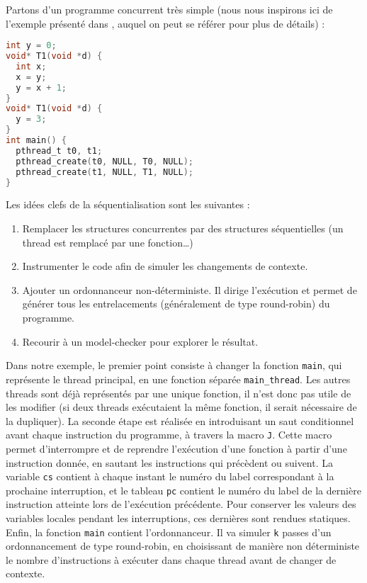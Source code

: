 Partons d'un programme concurrent très simple (nous nous inspirons ici
de l'exemple présenté dans \cite{LazyCSeq}, auquel on peut se
référer pour plus de détails) :

\begin{lstlisting}[language=C]
int y = 0;
void* T1(void *d) {
  int x;
  x = y;
  y = x + 1;
}
void* T1(void *d) {
  y = 3;
}
int main() {
  pthread_t t0, t1;
  pthread_create(t0, NULL, T0, NULL);
  pthread_create(t1, NULL, T1, NULL);
}
\end{lstlisting}

Les idées clefs de la séquentialisation sont les suivantes :

\begin{enumerate}
\def\labelenumi{\arabic{enumi})}
\item
  Remplacer les structures concurrentes par des structures séquentielles
  (un thread est remplacé par une fonction\dots)
\item
  Instrumenter le code afin de simuler les changements de contexte.
\item
  Ajouter un ordonnanceur non-déterministe. Il dirige l'exécution et
  permet de générer tous les entrelacements (généralement de type
  round-robin) du programme.
\item
  Recourir à un model-checker pour explorer le résultat.
\end{enumerate}

Dans notre exemple, le premier point consiste à changer la fonction
\texttt{main}, qui représente le thread principal, en une fonction
séparée \texttt{main\_thread}. Les autres threads sont déjà
représentés par une unique fonction, il n'est donc pas utile de les
modifier (si deux threads exécutaient la même fonction, il serait
nécessaire de la dupliquer). La seconde étape est réalisée en
introduisant un saut conditionnel avant chaque instruction du programme,
à travers la macro \texttt{J}. Cette macro permet d'interrompre et de
reprendre l'exécution d'une fonction à partir d'une instruction donnée,
en sautant les instructions qui précèdent ou suivent. La variable
\texttt{cs} contient à chaque instant le numéro du label
correspondant à la prochaine interruption, et le tableau \texttt{pc}
contient le numéro du label de la dernière instruction atteinte lors de
l'exécution précédente. Pour conserver les valeurs des variables locales
pendant les interruptions, ces dernières sont rendues statiques. Enfin,
la fonction \texttt{main} contient l'ordonnanceur. Il va simuler
\texttt{k} passes d'un ordonnancement de type round-robin, en
choisissant de manière non déterministe le nombre d'instructions à
exécuter dans chaque thread avant de changer de contexte.


